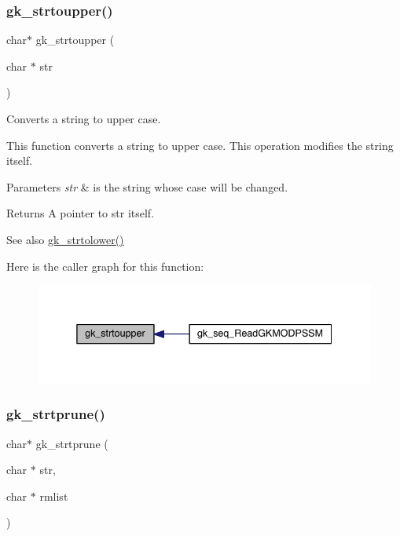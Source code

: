 \subsubsection{\texorpdfstring{gk\+\_\+strtoupper()}{gk\_strtoupper()}}
{\footnotesize\ttfamily char$\ast$ gk\+\_\+strtoupper (\begin{DoxyParamCaption}\item[{char $\ast$}]{str }\end{DoxyParamCaption})}



Converts a string to upper case. 

This function converts a string to upper case. This operation modifies the string itself.


\begin{DoxyParams}{Parameters}
{\em str} & is the string whose case will be changed. \\
\hline
\end{DoxyParams}
\begin{DoxyReturn}{Returns}
A pointer to {\ttfamily str} itself. 
\end{DoxyReturn}
\begin{DoxySeeAlso}{See also}
\hyperlink{a00143_aa2d603de6c132e340d85e8e125d847a0}{gk\+\_\+strtolower()} 
\end{DoxySeeAlso}
Here is the caller graph for this function\+:\nopagebreak
\begin{figure}[H]
\begin{center}
\leavevmode
\includegraphics[width=338pt]{a00143_ae2e962be7af156e5200766fa8543cff1_icgraph}
\end{center}
\end{figure}
\mbox{\label{a00143_a05261ee12d082a78cabc018d2f5e2266}} 
\subsubsection{\texorpdfstring{gk\+\_\+strtprune()}{gk\_strtprune()}}
{\footnotesize\ttfamily char$\ast$ gk\+\_\+strtprune (\begin{DoxyParamCaption}\item[{char $\ast$}]{str,  }\item[{char $\ast$}]{rmlist }\end{DoxyParamCaption})}




